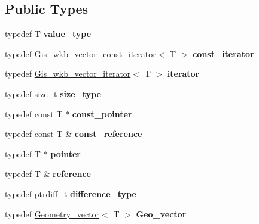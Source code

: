 \subsection*{Public Types}
\begin{DoxyCompactItemize}
\item 
\mbox{\label{classGis__wkb__vector_a2e732103178cf37f28e12ac3fcf8dbad}} 
typedef T {\bfseries value\+\_\+type}
\item 
\mbox{\label{classGis__wkb__vector_aa837f1d06eced6862e92a17571e1210d}} 
typedef \mbox{\hyperlink{classGis__wkb__vector__const__iterator}{Gis\+\_\+wkb\+\_\+vector\+\_\+const\+\_\+iterator}}$<$ T $>$ {\bfseries const\+\_\+iterator}
\item 
\mbox{\label{classGis__wkb__vector_a9743445c35e4529e32b8b52eef27ae43}} 
typedef \mbox{\hyperlink{classGis__wkb__vector__iterator}{Gis\+\_\+wkb\+\_\+vector\+\_\+iterator}}$<$ T $>$ {\bfseries iterator}
\item 
\mbox{\label{classGis__wkb__vector_a04e337aec3bab6278a242ad9fd467990}} 
typedef size\+\_\+t {\bfseries size\+\_\+type}
\item 
\mbox{\label{classGis__wkb__vector_a5916d41df432d011f36b9f1919e06a9c}} 
typedef const T $\ast$ {\bfseries const\+\_\+pointer}
\item 
\mbox{\label{classGis__wkb__vector_a998e8e4395b7d8f6109617aeabf75e17}} 
typedef const T \& {\bfseries const\+\_\+reference}
\item 
\mbox{\label{classGis__wkb__vector_ab387587101b003de7423e56f591a41da}} 
typedef T $\ast$ {\bfseries pointer}
\item 
\mbox{\label{classGis__wkb__vector_aeb3025cfa5235dce3859d869bfe31f4f}} 
typedef T \& {\bfseries reference}
\item 
\mbox{\label{classGis__wkb__vector_a630e214e956989fa8431697a3fdcf222}} 
typedef ptrdiff\+\_\+t {\bfseries difference\+\_\+type}
\item 
\mbox{\label{classGis__wkb__vector_aed9523b7a8ad7857b0e9d35a16b32233}} 
typedef \mbox{\hyperlink{classGeometry__vector}{Geometry\+\_\+vector}}$<$ T $>$ {\bfseries Geo\+\_\+vector}
\end{DoxyCompactItemize}
